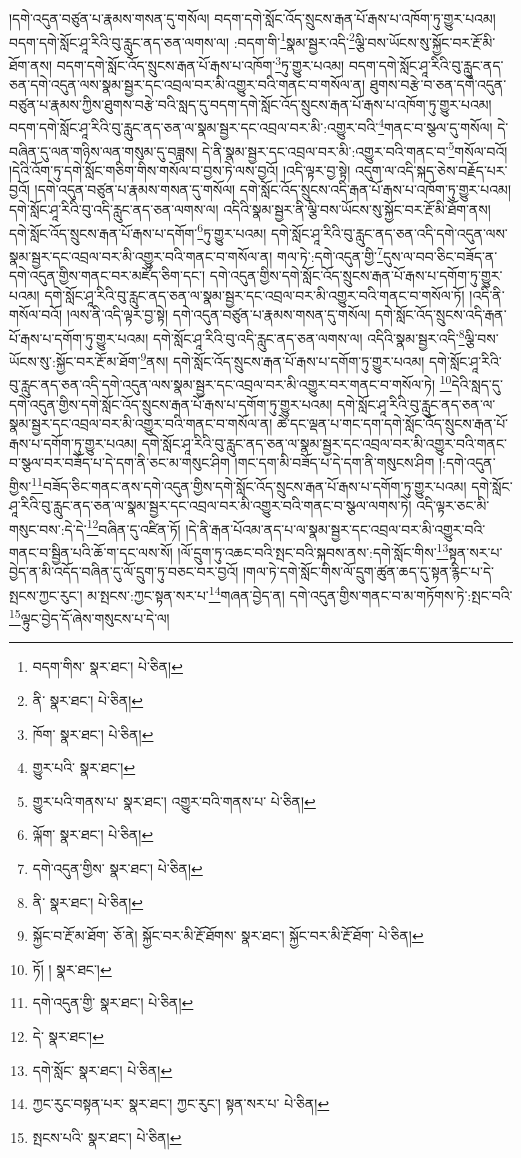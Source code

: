 །དགེ་འདུན་བཙུན་པ་རྣམས་གསན་དུ་གསོལ། བདག་དགེ་སློང་འོད་སྲུངས་རྒན་པོ་རྒས་པ་འཁོག་ཏུ་གྱུར་པའམ། བདག་དགེ་སློང་ཤཱ་རིའི་བུ་རླུང་ནད་ཅན་ལགས་ལ། :བདག་གི་\footnote{བདག་གིས་  སྣར་ཐང་།  པེ་ཅིན། }སྣམ་སྦྱར་འདི་\footnote{ནི་  སྣར་ཐང་།  པེ་ཅིན། }ལྕི་བས་ཡོངས་སུ་སྐྱོང་བར་རྔོ་མི་ཐོག་ནས། བདག་དགེ་སློང་འོད་སྲུངས་རྒན་པོ་རྒས་པ་འཁོག་\footnote{ཁོག་  སྣར་ཐང་།  པེ་ཅིན། }ཏུ་གྱུར་པའམ། བདག་དགེ་སློང་ཤཱ་རིའི་བུ་རླུང་ནད་ཅན་དགེ་འདུན་ལས་སྣམ་སྦྱར་དང་འབྲལ་བར་མི་འགྱུར་བའི་གནང་བ་གསོལ་ན། ཐུགས་བརྩེ་བ་ཅན་དགེ་འདུན་བཙུན་པ་རྣམས་ཀྱིས་ཐུགས་བརྩེ་བའི་སླད་དུ་བདག་དགེ་སློང་འོད་སྲུངས་རྒན་པོ་རྒས་པ་འཁོག་ཏུ་གྱུར་པའམ། བདག་དགེ་སློང་ཤཱ་རིའི་བུ་རླུང་ནད་ཅན་ལ་སྣམ་སྦྱར་དང་འབྲལ་བར་མི་:འགྱུར་བའི་\footnote{གྱུར་པའི་  སྣར་ཐང་། }གནང་བ་སྩལ་དུ་གསོལ། དེ་བཞིན་དུ་ལན་གཉིས་ལན་གསུམ་དུ་བཟླས། དེ་ནི་སྣམ་སྦྱར་དང་འབྲལ་བར་མི་:འགྱུར་བའི་གནང་བ་\footnote{གྱུར་པའི་གནས་པ་  སྣར་ཐང་། འགྱུར་བའི་གནས་པ་  པེ་ཅིན། }གསོལ་བའོ། །དེའི་འོག་ཏུ་དགེ་སློང་གཅིག་གིས་གསོལ་བ་བྱས་ཏེ་ལས་བྱའོ། །འདི་ལྟར་བྱ་སྟེ། འདུག་ལ་འདི་སྐད་ཅེས་བརྗོད་པར་བྱའོ། །དགེ་འདུན་བཙུན་པ་རྣམས་གསན་དུ་གསོལ། དགེ་སློང་འོད་སྲུངས་འདི་རྒན་པོ་རྒས་པ་འཁོག་ཏུ་གྱུར་པའམ། དགེ་སློང་ཤཱ་རིའི་བུ་འདི་རླུང་ནད་ཅན་ལགས་ལ། འདིའི་སྣམ་སྦྱར་ནི་ལྕི་བས་ཡོངས་སུ་སྐྱོང་བར་རྔོ་མི་ཐོག་ནས། དགེ་སློང་འོད་སྲུངས་རྒན་པོ་རྒས་པ་དགོག་\footnote{ལྐོག་  སྣར་ཐང་།  པེ་ཅིན། }ཏུ་གྱུར་པའམ། དགེ་སློང་ཤཱ་རིའི་བུ་རླུང་ནད་ཅན་འདི་དགེ་འདུན་ལས་སྣམ་སྦྱར་དང་འབྲལ་བར་མི་འགྱུར་བའི་གནང་བ་གསོལ་ན། གལ་ཏེ་:དགེ་འདུན་གྱི་\footnote{དགེ་འདུན་གྱིས་  སྣར་ཐང་།  པེ་ཅིན། }དུས་ལ་བབ་ཅིང་བཟོད་ན་དགེ་འདུན་གྱིས་གནང་བར་མཛོད་ཅིག་དང་། དགེ་འདུན་གྱིས་དགེ་སློང་འོད་སྲུངས་རྒན་པོ་རྒས་པ་དགོག་ཏུ་གྱུར་པའམ། དགེ་སློང་ཤཱ་རིའི་བུ་རླུང་ནད་ཅན་ལ་སྣམ་སྦྱར་དང་འབྲལ་བར་མི་འགྱུར་བའི་གནང་བ་གསོལ་ཏོ། །འདི་ནི་གསོལ་བའོ། །ལས་ནི་འདི་ལྟར་བྱ་སྟེ། དགེ་འདུན་བཙུན་པ་རྣམས་གསན་དུ་གསོལ། དགེ་སློང་འོད་སྲུངས་འདི་རྒན་པོ་རྒས་པ་དགོག་ཏུ་གྱུར་པའམ། དགེ་སློང་ཤཱ་རིའི་བུ་འདི་རླུང་ནད་ཅན་ལགས་ལ། འདིའི་སྣམ་སྦྱར་འདི་\footnote{ནི་  སྣར་ཐང་།  པེ་ཅིན། }ལྕི་བས་ཡོངས་སུ་:སྐྱོང་བར་རྔོ་མ་ཐོག་\footnote{སྐྱོང་བ་རྔོ་མ་ཐོག་  ཅོ་ནེ། སྐྱོང་བར་མི་རྔོ་ཐོགས་  སྣར་ཐང་། སྐྱོང་བར་མི་རྔོ་ཐོག་  པེ་ཅིན། }ནས། དགེ་སློང་འོད་སྲུངས་རྒན་པོ་རྒས་པ་དགོག་ཏུ་གྱུར་པའམ། དགེ་སློང་ཤཱ་རིའི་བུ་རླུང་ནད་ཅན་འདི་དགེ་འདུན་ལས་སྣམ་སྦྱར་དང་འབྲལ་བར་མི་འགྱུར་བར་གནང་བ་གསོལ་ཏེ། \footnote{ཏོ། །   སྣར་ཐང་། }དེའི་སླད་དུ་དགེ་འདུན་གྱིས་དགེ་སློང་འོད་སྲུངས་རྒན་པོ་རྒས་པ་དགོག་ཏུ་གྱུར་པའམ། དགེ་སློང་ཤཱ་རིའི་བུ་རླུང་ནད་ཅན་ལ་སྣམ་སྦྱར་དང་འབྲལ་བར་མི་འགྱུར་བའི་གནང་བ་གསོལ་ན། ཚེ་དང་ལྡན་པ་གང་དག་དགེ་སློང་འོད་སྲུངས་རྒན་པོ་རྒས་པ་དགོག་ཏུ་གྱུར་པའམ། དགེ་སློང་ཤཱ་རིའི་བུ་རླུང་ནད་ཅན་ལ་སྣམ་སྦྱར་དང་འབྲལ་བར་མི་འགྱུར་བའི་གནང་བ་སྩལ་བར་བཟོད་པ་དེ་དག་ནི་ཅང་མ་གསུང་ཤིག །གང་དག་མི་བཟོད་པ་དེ་དག་ནི་གསུངས་ཤིག །:དགེ་འདུན་གྱིས་\footnote{དགེ་འདུན་གྱི་  སྣར་ཐང་།  པེ་ཅིན། }བཟོད་ཅིང་གནང་ནས་དགེ་འདུན་གྱིས་དགེ་སློང་འོད་སྲུངས་རྒན་པོ་རྒས་པ་དགོག་ཏུ་གྱུར་པའམ། དགེ་སློང་ཤཱ་རིའི་བུ་རླུང་ནད་ཅན་ལ་སྣམ་སྦྱར་དང་འབྲལ་བར་མི་འགྱུར་བའི་གནང་བ་སྩལ་ལགས་ཏེ། འདི་ལྟར་ཅང་མི་གསུང་བས་:དེ་དེ་\footnote{དེ་  སྣར་ཐང་། }བཞིན་དུ་འཛིན་ཏོ། །དེ་ནི་རྒན་པོའམ་ནད་པ་ལ་སྣམ་སྦྱར་དང་འབྲལ་བར་མི་འགྱུར་བའི་གནང་བ་སྦྱིན་པའི་ཆོ་ག་དང་ལས་སོ། །ལོ་དྲུག་ཏུ་འཆང་བའི་སྤང་བའི་སྐབས་ནས་:དགེ་སློང་གིས་\footnote{དགེ་སློང་  སྣར་ཐང་།  པེ་ཅིན། }སྟན་སར་པ་བྱེད་ན་མི་འདོད་བཞིན་དུ་ལོ་དྲུག་ཏུ་བཅང་བར་བྱའོ། །གལ་ཏེ་དགེ་སློང་གིས་ལོ་དྲུག་ཚུན་ཆད་དུ་སྟན་རྙིང་པ་དེ་སྤངས་ཀྱང་རུང་། མ་སྤངས་:ཀྱང་སྟན་སར་པ་\footnote{ཀྱང་རུང་བསྟན་པར་  སྣར་ཐང་། ཀྱང་རུང་། སྟན་སར་པ་  པེ་ཅིན། }གཞན་བྱེད་ན། དགེ་འདུན་གྱིས་གནང་བ་མ་གཏོགས་ཏེ་:སྤང་བའི་\footnote{སྤངས་པའི་  སྣར་ཐང་།  པེ་ཅིན། }ལྟུང་བྱེད་དོ་ཞེས་གསུངས་པ་དེ་ལ། 